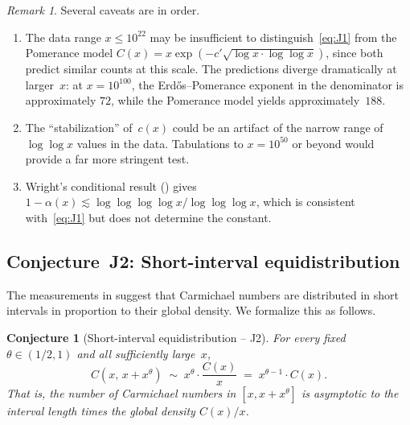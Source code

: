 \documentclass[12pt]{amsart}
\theoremstyle{plain}
\newtheorem{conjecture}[theorem]{Conjecture}
\theoremstyle{definition}
\theoremstyle{remark}
\newtheorem{remark}[theorem]{Remark}
\begin{document}
\begin{remark}\label{rem:J1_caveats}
Several caveats are in order.
\begin{enumerate}
\item The data range $x\le 10^{22}$ may be insufficient to
  distinguish~\eqref{eq:J1} from the Pomerance model
  $C(x)=x\exp(-c'\sqrt{\log x\cdot\log\log x})$, since both predict
  similar counts at this scale.  The predictions diverge dramatically
  at larger~$x$: at $x=10^{100}$, the Erd\H{o}s--Pomerance exponent
  in the denominator is approximately $72$, while the Pomerance model
  yields approximately~$188$.
\item The ``stabilization'' of~$c(x)$ could be an artifact of the
  narrow range of $\log\log x$ values in the data.
  Tabulations to $x=10^{50}$ or beyond would provide a far more
  stringent test.
\item Wright's conditional result () gives
  $1-\alpha(x)\lesssim\log\log\log\log x/\log\log\log x$, which is
  consistent with~\eqref{eq:J1} but does not determine the constant.
\end{enumerate}
\end{remark}

\subsection{Conjecture~J2: Short-interval equidistribution}
\label{subsec:J2}

The measurements in  suggest that Carmichael numbers
are distributed in short intervals in proportion to their global
density.  We formalize this as follows.

\begin{conjecture}[Short-interval equidistribution -- J2]
\label{conj:J2}
For every fixed $\theta\in(1/2,1)$ and all sufficiently large~$x$,
\begin{equation}\label{eq:J2}
  C(x,\,x+x^{\theta})
  \;\sim\;
  x^{\theta}\cdot\frac{C(x)}{x}
  \;=\;
  x^{\theta-1}\cdot C(x).
\end{equation}
That is, the number of Carmichael numbers in $[x,x+x^{\theta}]$ is
asymptotic to the interval length times the global density $C(x)/x$.
\end{conjecture}
\end{document}
